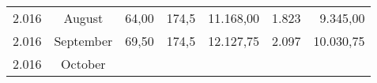 \documentclass[11pt,A4paper,]{article}
\begin{document}
\begin{longtable}[]{@{}rcrrrrr@{}}
\begin{minipage}[t]{0.09\columnwidth}
2.016\strut
\end{minipage} & \begin{minipage}[t]{0.13\columnwidth}\centering\strut
August\strut
\end{minipage} & \begin{minipage}[t]{0.09\columnwidth}\raggedleft\strut
64,00\strut
\end{minipage} & \begin{minipage}[t]{0.09\columnwidth}\raggedleft\strut
174,5\strut
\end{minipage} & \begin{minipage}[t]{0.13\columnwidth}\raggedleft\strut
11.168,00\strut
\end{minipage} & \begin{minipage}[t]{0.09\columnwidth}\raggedleft\strut
1.823\strut
\end{minipage} & \begin{minipage}[t]{0.20\columnwidth}\raggedleft\strut
9.345,00\strut
\end{minipage}\tabularnewline
\begin{minipage}[t]{0.09\columnwidth}\raggedleft\strut
2.016\strut
\end{minipage} & \begin{minipage}[t]{0.13\columnwidth}\centering\strut
September\strut
\end{minipage} & \begin{minipage}[t]{0.09\columnwidth}\raggedleft\strut
69,50\strut
\end{minipage} & \begin{minipage}[t]{0.09\columnwidth}\raggedleft\strut
174,5\strut
\end{minipage} & \begin{minipage}[t]{0.13\columnwidth}\raggedleft\strut
12.127,75\strut
\end{minipage} & \begin{minipage}[t]{0.09\columnwidth}\raggedleft\strut
2.097\strut
\end{minipage} & \begin{minipage}[t]{0.20\columnwidth}\raggedleft\strut
10.030,75\strut
\end{minipage}\tabularnewline
\begin{minipage}[t]{0.09\columnwidth}\raggedleft\strut
2.016\strut
\end{minipage} & \begin{minipage}[t]{0.13\columnwidth}\centering\strut
October\strut
\end{minipage} & \begin{minipage}[t]{0.09\columnwidth}\raggedleft\strut

\end{minipage}
\end{longtable}
\end{document}
